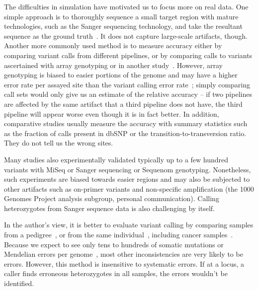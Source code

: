 \documentclass{bioinfo-ori}
\begin{document}
The difficulties in simulation have motivated us to focus more on real data. One
simple approach is to thoroughly sequence a small target region with mature
technologies, such as the Sanger sequencing technology, and take the resultant sequence as
the ground truth~\citep{Harismendy:2009aa}. It does not capture large-scale
artifacts, though. Another more commonly used method is to measure accuracy
either by comparing variant calls from different pipelines, or by comparing
calls to variants ascertained with array genotyping or in another
study~\citep{Clark:2011aa,Li:2012fk,Lam:2012aa,Lam:2012fk,Boland:2013aa,Liu:2013aa,Goode:2013aa,ORawe:2013aa,Zook:2014aa,Cheng:2014aa}.
However, array genotyping is biased to easier portions of the genome and may have a higher error rate per assayed site than
the variant calling error rate~\citep{Bentley:2008cr}; simply comparing call
sets would only give us an estimate of the relative accuracy -- if two
pipelines are affected by the same artifact that a third pipeline does
not have, the third pipeline will appear worse even though it is in fact
better.  In addition, comparative studies usually measure the accuracy with
summary statistics such as the fraction of calls present in dbSNP or the
transition-to-transversion ratio.  They do not tell us the wrong sites.

Many studies also experimentally validated typically up to a few hundred
variants with MiSeq or Sanger sequencing or Sequenom genotyping. Nonetheless,
such experiments are biased towards easier regions and may also be subjected
to other artifacts such as on-primer variants and non-specific amplification
(the 1000 Genomes Project analysis subgroup, personal communication).
Calling heterozygotes from Sanger sequence data is also challenging by itself.


In the author's view, it is better to evaluate variant calling by
comparing samples from a pedigree~\citep{Zook:2014aa}, or from the same
individual~\citep{Nickles:2012aa}, including cancer
samples~\citep{Lower:2012aa}. Because we expect to see only tens to hundreds of
somatic mutations or Mendelian errors per genome~\citep{Conrad:2011kx}, most other inconsistencies
are very likely to be errors. However, this method is insensitive to systematic
errors.  If at a locus, a caller finds erroneous heterozygotes in all samples,
the errors wouldn't be identified.
\end{document}
